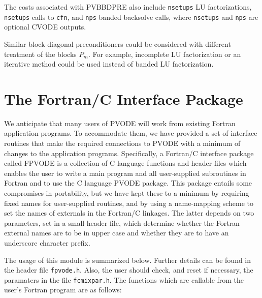 The costs associated with PVBBDPRE also include {\tt nsetups} LU
factorizations, {\tt nsetups} calls to {\tt cfn}, and {\tt nps} banded
backsolve calls, where {\tt nsetups} and {\tt nps} are optional CVODE
outputs.

Similar block-diagonal preconditioners could be considered with different
treatment of the blocks $P_m$. For example, incomplete LU factorization or
an iterative method could be used instead of banded LU factorization.


\section{The Fortran/C Interface Package}
We anticipate that many users of PVODE will work from existing Fortran
application programs.  To accommodate them, we have provided a set of
interface routines that make the required connections to PVODE with a
minimum of changes to the application programs.  Specifically, a
Fortran/C interface package called FPVODE is a collection of C
language functions and header files which enables the user to write a
main program and all user-supplied subroutines in Fortran and to use
the C language PVODE package.  This package entails some compromises
in portability, but we have kept these to a minimum by requiring fixed
names for user-supplied routines, and by using a name-mapping scheme
to set the names of externals in the Fortran/C linkages.  The latter
depends on two parameters, set in a small header file, which determine
whether the Fortran external names are to be in upper case and whether
they are to have an underscore character prefix.

The usage of this module is summarized below.  Further details can be
found in the header file {\tt fpvode.h}.  Also, the user should check,
and reset if necessary, the paramaters in the file {\tt fcmixpar.h}.
The functions which are callable from the user's Fortran program are
as follows:

